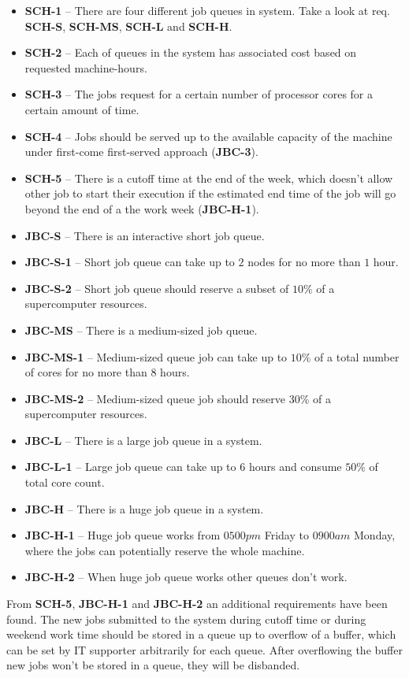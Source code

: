 \documentclass{report}
\begin{document}
\begin{itemize}
	\item
	{
		\textbf{SCH-1} -- There are four different job queues in system. Take a look at req. \textbf{SCH-S}, \textbf{SCH-MS}, \textbf{SCH-L} and \textbf{SCH-H}.
	}
	\item
	{
		\textbf{SCH-2} -- Each of queues in the system has associated cost based on requested machine-hours.
	}
	\item
	{
		\textbf{SCH-3} -- The jobs request for a certain number of processor cores for a certain amount of time.
	}
	\item
	{
		\textbf{SCH-4} -- Jobs should be served up to the available capacity of the machine under first-come first-served approach (\textbf{JBC-3}).
	}
	\item
	{
		\textbf{SCH-5} -- There is a cutoff time at the end of the week, which doesn't allow other job to start their execution if the estimated end time of the job will go beyond the end of a the work week (\textbf{JBC-H-1}).
	}
	\item
	{
		\textbf{JBC-S} -- There is an interactive short job queue.
	}
	\item
	{
		\textbf{JBC-S-1} -- Short job queue can take up to $2$ nodes for no more than $1$ hour.
	}
	\item
	{
		\textbf{JBC-S-2} -- Short job queue should reserve a subset of $10\%$ of a supercomputer resources.
	}
	\item
	{
		\textbf{JBC-MS} -- There is a medium-sized job queue.
	}
	\item
	{
		\textbf{JBC-MS-1} -- Medium-sized queue job can take up to $10\%$ of a total number of cores for no more than $8$ hours.
	}
	\item
	{
		\textbf{JBC-MS-2} -- Medium-sized queue job should reserve $30\%$ of a supercomputer resources.
	}
	\item
	{
		\textbf{JBC-L} -- There is a large job queue in a system.
	}
	\item
	{
		\textbf{JBC-L-1} -- Large job queue can take up to $6$ hours and consume $50\%$ of total core count.
	}
	\item
	{
		\textbf{JBC-H} -- There is a huge job queue in a system.
	}
	\item
	{
		\textbf{JBC-H-1} -- Huge job queue works from $0500pm$ Friday to $0900am$ Monday, where the jobs can potentially reserve the whole machine.
	}
	\item
	{
		\textbf{JBC-H-2} -- When huge job queue works other queues don't work.
	}
\end{itemize}
	From \textbf{SCH-5}, \textbf{JBC-H-1} and \textbf{JBC-H-2} an additional requirements have been found. The new jobs submitted to the system during cutoff time or during weekend work time should be stored in a queue up to overflow of a buffer, which can be set by IT supporter arbitrarily for each queue. After overflowing the buffer new jobs won't be stored in a queue, they will be disbanded.
\end{document}
